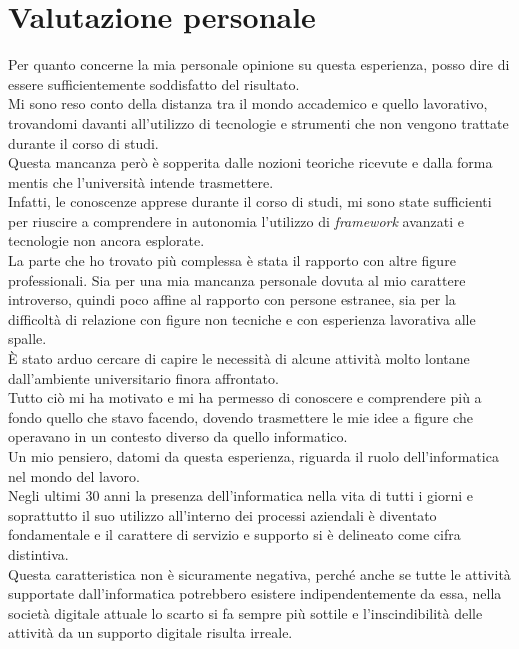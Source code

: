 

\section{Valutazione personale}

Per quanto concerne la mia personale opinione su questa esperienza, posso dire di essere sufficientemente soddisfatto del risultato.\\
Mi sono reso conto della distanza tra il mondo accademico e quello lavorativo, trovandomi davanti all'utilizzo di tecnologie e strumenti che non vengono trattate durante il corso di studi.\\
Questa mancanza però è sopperita dalle nozioni teoriche ricevute e dalla forma mentis che l'università intende trasmettere.\\
Infatti, le conoscenze apprese durante il corso di studi, mi sono state sufficienti per riuscire a comprendere in autonomia l'utilizzo di \textit{framework} avanzati e tecnologie non ancora esplorate.\\
La parte che ho trovato più complessa è stata il rapporto con altre figure professionali. Sia per una mia mancanza personale dovuta al mio carattere introverso, quindi poco affine al rapporto con persone estranee, sia per la difficoltà di relazione con figure non tecniche e con esperienza lavorativa alle spalle.\\
È stato arduo cercare di capire le necessità di alcune attività molto lontane dall'ambiente universitario finora affrontato.\\
Tutto ciò mi ha motivato e mi ha permesso di conoscere e comprendere più a fondo quello che stavo facendo, dovendo trasmettere le mie idee a figure che operavano in un contesto diverso da quello informatico.\\
Un mio pensiero, datomi da questa esperienza, riguarda il ruolo dell'informatica nel mondo del lavoro.\\
Negli ultimi 30 anni la presenza dell'informatica nella vita di tutti i giorni e soprattutto il suo utilizzo all'interno dei processi aziendali è diventato fondamentale e il carattere di servizio e supporto si è delineato come cifra distintiva.\\
Questa caratteristica non è sicuramente negativa, perché anche se tutte le attività supportate dall'informatica potrebbero esistere indipendentemente da essa, nella società digitale attuale lo scarto si fa sempre più sottile e l'inscindibilità delle attività da un supporto digitale risulta irreale.\\
